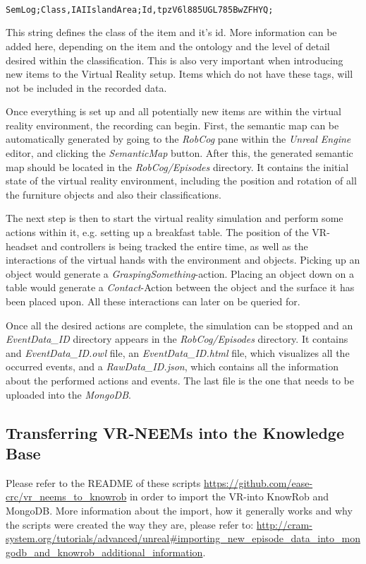 \begin{lstlisting}

SemLog;Class,IAIIslandArea;Id,tpzV6l885UGL785BwZFHYQ;

\end{lstlisting}
This string defines the class of the item and it's id. More information can be added here, depending on the item and the ontology and the level of detail desired within the classification. This is also very important when introducing new items to the Virtual Reality setup. Items which do not have these tags, will not be included in the recorded \neem data. 

Once everything is set up and all potentially new items are within the virtual reality environment, the recording can begin. First, the semantic map can be automatically generated by going to the \textit{RobCog} pane within the \textit{Unreal Engine} editor, and clicking the \textit{SemanticMap} button. 
After this, the generated semantic map should be located in the \textit{RobCog/Episodes} directory. It contains the initial state of the virtual reality environment, including the position and rotation of all the furniture objects and also their classifications. 

The next step is then to start the virtual reality simulation and perform some actions within it, e.g. setting up a breakfast table. The position of the VR-headset and controllers is being tracked the entire time, as well as the interactions of the virtual hands with the environment and objects. Picking up an object would generate a \textit{GraspingSomething}-action. Placing an object down on a table would generate a \textit{Contact}-Action between the object and the surface it has been placed upon. All these interactions can later on be queried for. 

Once all the desired actions are complete, the simulation can be stopped and an \textit{EventData\_ID} directory appears in the \textit{RobCog/Episodes} directory. It contains and \textit{EventData\_ID.owl} file, an \textit{EventData\_ID.html} file, which visualizes all the occurred events, and a \textit{RawData\_ID.json}, which contains all the information about the performed actions and events. The last file is the one that needs to be uploaded into the \textit{MongoDB}. 


\subsection{Transferring VR-NEEMs into the Knowledge Base}
Please refer to the README of these scripts \url{https://github.com/ease-crc/vr_neems_to_knowrob} in order to import the VR-\neems into KnowRob and MongoDB. More information about the import, how it generally works and why the scripts were created the way they are, please refer to: \url{http://cram-system.org/tutorials/advanced/unreal#importing_new_episode_data_into_mongodb_and_knowrob_additional_information}. 

